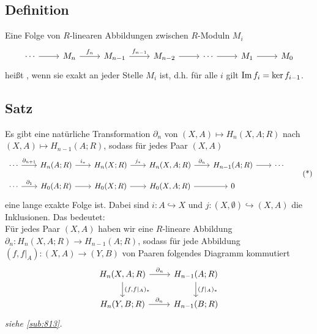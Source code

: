 \subsection[Definition: Lange exakte Sequenz von $R$-Moduln]{Definition} %
\label{sub:87}
Eine Folge von $R$-linearen Abbildungen zwischen $R$-Moduln $M_i$
\[
	\begin{tikzcd}
		\cdots \rar & M_n \rar["f_n"]  & M_{n-1} \rar["f_{n-1}"] & M_{n-2} \rar & \cdots \rar & M_1 \rar & M_0
	\end{tikzcd}
\]
heißt , wenn sie exakt an jeder Stelle $M_i$ ist, d.h. für alle $i$ gilt $\operatorname{Im} f_i = \ker f_{i-1}$.

\subsection[Satz: Existenz der Paarsequenz]{Satz} %
\label{sub:88}
Es gibt eine natürliche Transformation $\partial_n$ von $(X,A) \mapsto H_n(X,A;R)$ nach $(X,A) \mapsto H_{n-1}(A;R)$, sodass für jedes Paar $(X,A)$
\begin{equation*}
	\begin{tikzcd}[row sep=1em, column sep=2em]
		\cdots  \rar["\partial_{n+1}"] & H_n(A;R) \rar["i_*"] & H_n(X;R) \rar["j_*"] & H_n(X,A;R) \rar["\partial_n"] 
		& H_{n-1}(A;R) \rar & \cdots \\
		\cdots \rar["\partial_1"] & H_0(A;R) \rar & H_0(X;R) \rar & H_0(X,A;R) \rar & 0
	\end{tikzcd} \label{eq:88}\tag{*}
\end{equation*}
eine lange exakte Folge ist. Dabei sind $i : A \hookrightarrow X$ und $j : (X,\emptyset) \hookrightarrow (X,A)$ die Inklusionen. Das bedeutet: \smallskip\\
Für jedes Paar $(X,A)$ haben wir eine $R$-lineare Abbildung $\partial_n : H_n(X,A;R) \to H_{n-1}(A;R)$, sodass für jede Abbildung $(f,f|_{A}) : (X,A) \to (Y,B)$ von Paaren
folgendes Diagramm kommutiert
\[
	\begin{tikzcd}
		H_{n}(X,A;R) \rar["\partial_n"] \dar["{(f,f|_A)_*}"] & H_{n-1}(A;R) \dar["{(f|_A)_*}"] \\
		H_n(Y,B;R) \rar["\partial_n"] & H_{n-1}(B;R)
	\end{tikzcd}
\]
\emph{siehe \ref{sub:813}.}

